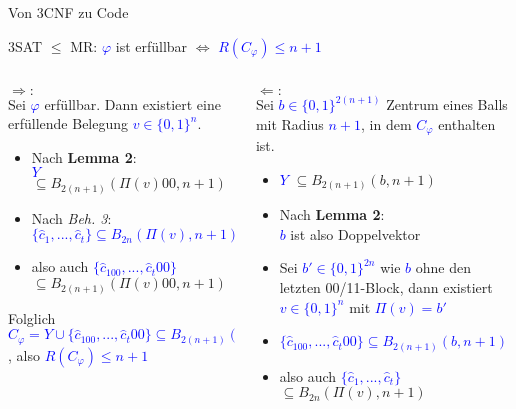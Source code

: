 \documentclass[10pt, aspectratio=169]{beamer}
\begin{document}
\begin{frame}{Von 3CNF zu Code}
\begin{center}
    \alert{3SAT $\leq$ MR:} \textcolor{blue}{$\varphi$} ist erfüllbar $\Leftrightarrow$ \textcolor{blue}{$R(C_\varphi) \leq n+1$}
\end{center}

\vspace{1em}
\begin{columns}[T] %

    \begin{column}{0.5\textwidth}
        $\Rightarrow:$\\
        Sei \textcolor{blue}{$\varphi$} erfüllbar. Dann existiert eine erfüllende Belegung \textcolor{blue}{$v \in \{0,1\}^n$}.\\
        \begin{itemize}
            \item Nach \textbf{Lemma 2}: \\\textcolor{blue}{$Y$} \alert{$\subseteq B_{2(n+1)}(\Pi(v)00, n+1)$}
            \item Nach \textit{Beh. 3}: \textcolor{blue}{$\{\hat{c}_1,...,\hat{c}_t\} \subseteq B_{2n}(\Pi(v), n+1)$ }
            \item also auch \textcolor{blue}{$\{\hat{c}_100,...,\hat{c}_t00\}$} \alert{$\subseteq B_{2(n+1)}(\Pi(v)00, n+1)$} 
        \end{itemize}
    \vspace{1em}
    Folglich \textcolor{blue}{$C_\varphi = Y \cup \{\hat{c}_100,...,\hat{c}_t00\} \subseteq  B_{2(n+1)}(\Pi(v)00, n+1) $ }, also \textcolor{blue}{$R(C_\varphi)\leq n+1$}
    \end{column}
    \begin{column}{0.5\textwidth}
        $\Leftarrow:$\\
        Sei \textcolor{blue}{$b \in \{0,1\}^{2(n+1)}$} Zentrum eines Balls mit Radius \textcolor{blue}{$n+1$}, in dem \textcolor{blue}{$C_\varphi$} enthalten ist.
        \begin{itemize}
            \item \textcolor{blue}{$Y$} \alert{$\subseteq B_{2(n+1)}(b,n+1)$}
            \item Nach\textbf{ Lemma 2}: \\ \textcolor{blue}{$b$} ist also Doppelvektor
            \item Sei \textcolor{blue}{$b' \in \{0,1\}^{2n}$} wie \textcolor{blue}{$b$} ohne den letzten 00/11-Block, dann existiert \textcolor{blue}{$v \in \{0,1\}^n$} mit \textcolor{blue}{$\Pi(v) = b'$}
            \item \textcolor{blue}{$\{\hat{c}_100,...,\hat{c}_t00\} \subseteq B_{2(n+1)}(b, n+1)$ } 
            \item also auch  \textcolor{blue}{$\{\hat{c}_1,...,\hat{c}_t\}$} \alert{$\subseteq B_{2n}(\Pi(v), n+1)$ }
        \end{itemize}
        \vspace{0.4em}


\end{column}
\end{columns}
\end{frame}
\end{document}
